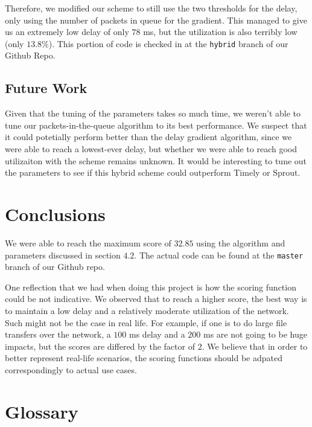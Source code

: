 \documentclass[11pt,a4paper]{article}
\begin{document}
Therefore, we modified our scheme to still use the two thresholds for the delay,
only using the number of packets in queue for the gradient. This managed to give
us an extremely low delay of only $78$ ms, but the utilization is also terribly
low (only $13.8\%$). This portion of code is checked in at the \texttt{hybrid} branch of
our Github Repo.

\subsection{Future Work}

Given that the tuning of the parameters takes so much time, we weren't able to
tune our packets-in-the-queue algorithm to its best performance. We suspect that
it could potetially perform better than the delay gradient algorithm, since we
were able to reach a lowest-ever delay, but whether we were able to reach good
utilizaiton with the scheme remains unknown. It would be interesting to tune out
the parameters to see if this hybrid scheme could outperform Timely or Sprout.

\section{Conclusions}

We were able to reach the maximum score of $32.85$ using the algorithm and parameters
discussed in section $4.2$. The actual code can be found at the \texttt{master}
branch of our Github repo.

One reflection that we had when doing this project is how the scoring function
could be not indicative. We observed that to reach a higher score, the best way
is to maintain a low delay and a relatively moderate utilization of the network.
Such might not be the case in real life. For example, if one is to do large file
transfers over the network, a $100$ ms delay and a $200$ ms are not going to be
huge impacts, but the scores are differed by the factor of $2$. We believe that
in order to better represent real-life scenarios, the scoring functions should
be adpated correspondingly to actual use cases.
%
%



\appendix

\section{Glossary}
\end{document}

